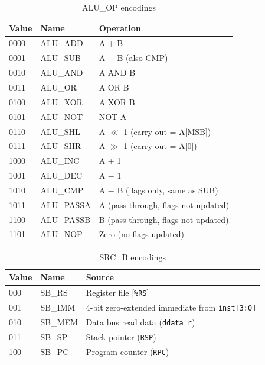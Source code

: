 \documentclass[a4paper,12pt]{report}
\newcommand{\asm}[1]{\texttt{#1}}
\newcommand{\field}[1]{\texttt{\small #1}}
\newcommand{\reg}[1]{\texttt{\%#1}}
\newcommand{\signal}[1]{\texttt{#1}}
\begin{document}
\begin{table}[htbp]
\centering
\caption{ALU\_OP encodings}
\label{tab:aluop}
\begin{tabularx}{\textwidth}{llX}
\toprule
\textbf{Value} & \textbf{Name} & \textbf{Operation} \\
\midrule
0000 & ALU\_ADD   & A + B \\
0001 & ALU\_SUB   & A $-$ B (also CMP) \\
0010 & ALU\_AND   & A AND B \\
0011 & ALU\_OR    & A OR B \\
0100 & ALU\_XOR   & A XOR B \\
0101 & ALU\_NOT   & NOT A \\
0110 & ALU\_SHL   & A $\ll$ 1 (carry out = A[MSB]) \\
0111 & ALU\_SHR   & A $\gg$ 1 (carry out = A[0]) \\
1000 & ALU\_INC   & A + 1 \\
1001 & ALU\_DEC   & A $-$ 1 \\
1010 & ALU\_CMP   & A $-$ B (flags only, same as SUB) \\
1011 & ALU\_PASSA & A (pass through, flags not updated) \\
1100 & ALU\_PASSB & B (pass through, flags not updated) \\
1101 & ALU\_NOP   & Zero (no flags updated) \\
\bottomrule
\end{tabularx}
\end{table}

\begin{table}[htbp]
\centering
\caption{SRC\_B encodings}
\label{tab:srcb}
\begin{tabularx}{\textwidth}{llX}
\toprule
\textbf{Value} & \textbf{Name} & \textbf{Source} \\
\midrule
000 & SB\_RS  & Register file [\reg{RS}] \\
001 & SB\_IMM & 4-bit zero-extended immediate from \field{inst[3:0]} \\
010 & SB\_MEM & Data bus read data (\signal{ddata\_r}) \\
011 & SB\_SP  & Stack pointer (\asm{RSP}) \\
100 & SB\_PC  & Program counter (\asm{RPC}) \\
\bottomrule
\end{tabularx}
\end{table}
\end{document}
